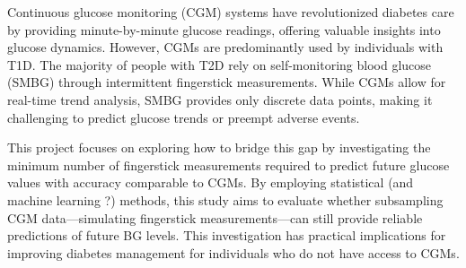 
Continuous glucose monitoring (CGM) systems have revolutionized diabetes care by providing minute-by-minute glucose readings, offering valuable insights into glucose dynamics. However, CGMs are predominantly used by individuals with T1D. The majority of people with T2D rely on self-monitoring blood glucose (SMBG) through intermittent fingerstick measurements. While CGMs allow for real-time trend analysis, SMBG provides only discrete data points, making it challenging to predict glucose trends or preempt adverse events.

This project focuses on exploring how to bridge this gap by investigating the minimum number of fingerstick measurements required to predict future glucose values with accuracy comparable to CGMs. By employing statistical (and machine learning ?) methods, this study aims to evaluate whether subsampling CGM data—simulating fingerstick measurements—can still provide reliable predictions of future BG levels. This investigation has practical implications for improving diabetes management for individuals who do not have access to CGMs.
